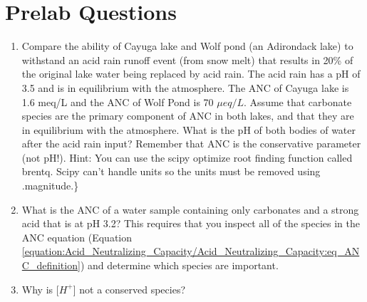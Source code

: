 \documentclass[letterpaper,10pt,english]{sphinxmanual}
\begin{document}
\section{Prelab Questions}
\label{\detokenize{Acid_Neutralizing_Capacity/Acid_Neutralizing_Capacity:prelab-questions}}\label{\detokenize{Acid_Neutralizing_Capacity/Acid_Neutralizing_Capacity:heading-anc-prelab-questions}}\begin{enumerate}
\item {} 
Compare the ability of Cayuga lake and Wolf pond (an Adirondack lake) to withstand an acid rain runoff event (from snow melt) that results in 20\% of the original lake water being replaced by acid rain. The acid rain has a pH of 3.5 and is in equilibrium with the atmosphere. The ANC of Cayuga lake is 1.6 meq/L and the ANC of Wolf Pond is 70 \(\mu eq/L\). Assume that carbonate species are the primary component of ANC in both lakes, and that they are in equilibrium with the atmosphere. What is the pH of both bodies of water after the acid rain input? Remember that ANC is the conservative parameter (not pH!). Hint: You can use the scipy optimize root finding function called brentq. Scipy can’t handle units so the units must be removed using .magnitude.\}

\item {} 
What is the ANC of a water sample containing only carbonates and a strong acid that is at pH 3.2? This requires that you inspect all of the species in the ANC equation (Equation \eqref{equation:Acid_Neutralizing_Capacity/Acid_Neutralizing_Capacity:eq_ANC_definition}) and determine which species are important.

\item {} 
Why is {[}\(H^+\){]} not a conserved species?

\end{enumerate}
\end{document}
